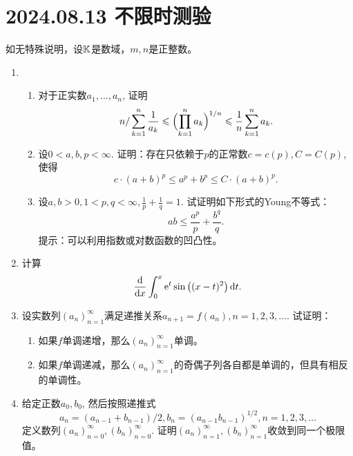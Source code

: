 \section*{2024.08.13 不限时测验}
如无特殊说明，设$\mathbb K$是数域，$m,n$是正整数。
\begin{enumerate}
    \item \begin{enumerate}
        \item 对于正实数$a_1,\dots,a_n$, 证明\begin{equation*}
            n/\sum_{k=1}^{n}\frac{1}{a_k} \leqslant \Bigl(\prod_{k=1}^{n}a_k\Bigr)^{1/n} \leqslant \frac{1}{n}\sum_{k=1}^{n}a_k.
        \end{equation*}
        \item 设$0<a,b,p<\infty$. 证明：存在只依赖于$p$的正常数$c=c(p), C=C(p)$, 使得\begin{equation*}
            c\cdot(a+b)^p\leqslant a^p+b^p\leqslant C\cdot(a+b)^p.
        \end{equation*}
        \item 设$a,b>0,1<p,q<\infty,\frac{1}{p}+\frac{1}{q}=1$. 试证明如下形式的Young不等式：\begin{equation*}
            ab\leqslant \frac{a^p}{p}+\frac{b^q}{q}.
        \end{equation*}
        提示：可以利用指数或对数函数的凹凸性。
    \end{enumerate}
    \item 计算\begin{equation*}
        \frac{\mathop{}\!\mathrm{d}}{\mathop{}\!\mathrm{d} x}\int_{0}^{x}\mathrm{e}^{t}\sin \left((x-t)^2\right)\mathop{}\!\mathrm{d} t.
    \end{equation*}
    \item 设实数列$\left(a_n\right)_{n=1}^\infty$满足递推关系$a_{n+1}=f(a_n),n=1,2,3,\dots.$ 试证明：\begin{enumerate}
        \item 如果$f$单调递增，那么$\left(a_n\right)_{n=1}^\infty$单调。
        \item 如果$f$单调递减，那么$\left(a_n\right)_{n=1}^\infty$的奇偶子列各自都是单调的，但具有相反的单调性。
    \end{enumerate}
    \item 给定正数$a_0,b_0$, 然后按照递推式\begin{equation*}
        a_n=(a_{n-1}+b_{n-1})/2,b_n=(a_{n-1}b_{n-1})^{1/2},n=1,2,3,\dots
    \end{equation*}定义数列$\left(a_n\right)_{n=0}^\infty,\left(b_n\right)_{n=0}^\infty$. 证明$\left(a_n\right)_{n=1}^\infty,\left(b_n\right)_{n=1}^\infty$收敛到同一个极限值。

\end{enumerate}
